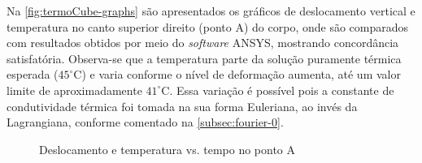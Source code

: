\documentclass[Tese.tex]{subfiles}
\begin{document}
Na \autoref{fig:termoCube-graphs} são apresentados os gráficos de deslocamento vertical e temperatura no canto superior direito (ponto A) do corpo, onde são comparados com resultados obtidos por meio do \emph{software} ANSYS, mostrando concordância satisfatória. Observa-se que a temperatura parte da solução puramente térmica esperada ($45^{\circ}$C) e varia conforme o nível de deformação aumenta, até um valor limite de aproximadamente $41^{\circ}$C. Essa variação é possível pois a constante de condutividade térmica foi tomada na sua forma Euleriana, ao invés da Lagrangiana, conforme comentado na \autoref{subsec:fourier-0}.

\begin{figure}[!htb]
	\centering
	\caption{Deslocamento e temperatura vs. tempo no ponto A}
	\label{fig:termoCube-graphs}
\end{figure}
\end{document}
